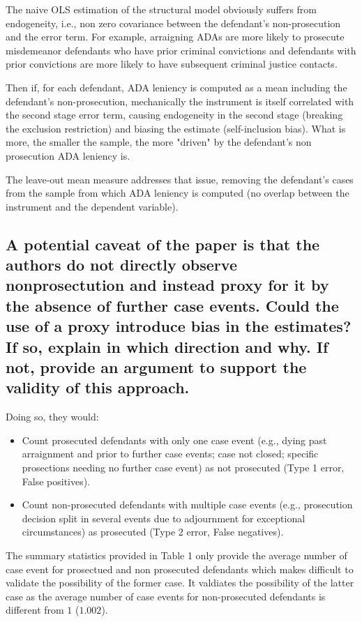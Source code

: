 \documentclass{article}
\begin{document}
The naive OLS estimation of the structural model obviously suffers from endogeneity, i.e., non zero covariance between the defendant's non-prosecution and the error term. For example, arraigning ADAs are more likely to prosecute misdemeanor defendants who have prior criminal convictions and defendants with prior convictions are more likely to have subsequent criminal justice contacts.

Then if, for each defendant, ADA leniency is computed as a mean including the defendant's non-prosecution, mechanically the instrument is itself correlated with the second stage error term, causing endogeneity in the second stage (breaking the exclusion restriction) and biasing the estimate (self-inclusion bias). What is more, the smaller the sample, the more "driven" by the defendant's non prosecution ADA leniency is.

The leave-out mean measure addresses that issue, removing the defendant's cases from the sample from which ADA leniency is computed (no overlap between the instrument and the dependent variable).

\subsection{A potential caveat of the paper is that the authors do not directly observe nonprosectution and instead proxy for it by the absence of further case events. Could the use of a proxy introduce bias in the estimates? If so, explain in which direction and why. If not, provide an argument to support the validity of this approach.}

Doing so, they would:
\begin{itemize}
    \item Count prosecuted defendants with only one case event (e.g., dying past arraignment and prior to further case events; case not closed; specific prosections needing no further case event) as not prosecuted (Type 1 error, False positives). 
    \item Count non-prosecuted defendants with multiple case events (e.g., prosecution decision split in several events due to adjournment for exceptional circumstances) as prosecuted (Type 2 error, False negatives).
\end{itemize}
The summary statistics provided in Table 1 only provide the average number of case event for prosectued and non prosecuted defendants which makes difficult to validate the possibility of the former case. It valdiates the possibility of the latter case as the average number of case events for non-prosecuted defendants is different from \(1\) (\(1.002\)).
\end{document}

